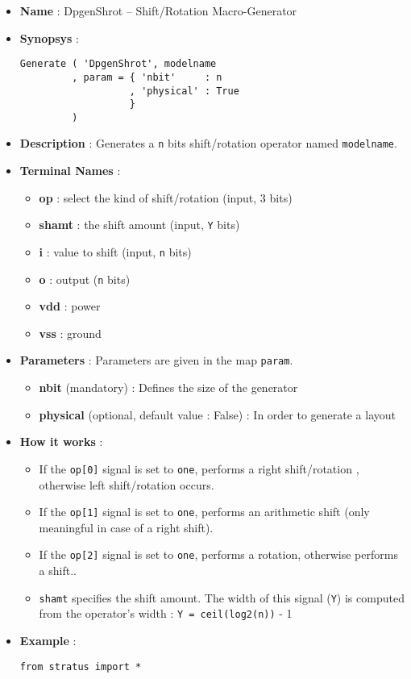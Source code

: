 \begin{itemize}
    \item \textbf{Name} : DpgenShrot -- Shift/Rotation Macro-Generator
    \item \textbf{Synopsys} :
\begin{verbatim}
Generate ( 'DpgenShrot', modelname
         , param = { 'nbit'     : n
                   , 'physical' : True         
                   }
         )
\end{verbatim}
    \item \textbf{Description} : Generates a \verb-n- bits shift/rotation operator named \verb-modelname-.
    \item \textbf{Terminal Names} :
    \begin{itemize}
        \item \textbf{op} : select the kind of shift/rotation (input, 3 bits)
        \item \textbf{shamt} : the shift amount (input, \verb-Y- bits)
        \item \textbf{i} : value to shift (input, \verb-n- bits)
        \item \textbf{o} : output (\verb-n- bits)
        \item \textbf{vdd} : power
        \item \textbf{vss} : ground
    \end{itemize}
    \item \textbf{Parameters} : Parameters are given in the map \verb-param-.
    \begin{itemize}
        \item \textbf{nbit} (mandatory) : Defines the size of the generator
        \item \textbf{physical} (optional, default value : False) : In order to generate a layout        
    \end{itemize}
    \item \textbf{How it works} :
    \begin{itemize}
        \item If the \verb-op[0]- signal is set to \verb-one-, performs a right shift/rotation , otherwise left shift/rotation occurs.
        \item If the \verb-op[1]- signal is set to \verb-one-, performs an arithmetic shift (only meaningful in case of a right shift).
        \item If the \verb-op[2]- signal is set to \verb-one-, performs a rotation, otherwise performs a shift..
        \item \verb-shamt- specifies the shift amount. The width of this signal (\verb-Y-) is computed from the operator's width : \verb-Y = ceil(log2(n))- - 1
    \end{itemize}    
    \item \textbf{Example} :
\begin{verbatim}
from stratus import *


\end{verbatim}
\end{itemize}
